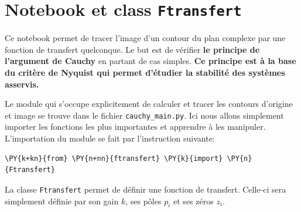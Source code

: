 \section{Notebook et class \texttt{Ftransfert}\label{principe-de-largument-de-cauchy}}
Ce notebook permet de tracer l'image d'un contour du plan complexe par
une fonction de transfert quelconque. Le but est de vérifier \textbf{le
principe de l'argument de Cauchy} en partant de cas simples. \textbf{Ce
principe est à la base du critère de Nyquist qui permet d'étudier la
stabilité des systèmes asservis.}
\begin{center}

\end{center}
Le module qui s'occupe explicitement de calculer et tracer les contours
d'origine et image se trouve dans le fichier \texttt{cauchy\_main.py}.
Ici nous allons simplement importer les fonctions les plus importantes
et apprendre à les manipuler.
L'importation du module se fait par l'instruction suivante:
\begin{tcolorbox}[breakable, size=fbox, boxrule=1pt, pad at break*=1mm,colback=cellbackground, colframe=cellborder]
\begin{Verbatim}[commandchars=\\\{\}]
\PY{k+kn}{from} \PY{n+nn}{ftransfert} \PY{k}{import} \PY{n}{Ftransfert}
\end{Verbatim}
\end{tcolorbox}

    La classe \texttt{Ftransfert} permet de définir une fonction de
transfert. Celle-ci sera simplement définie par son gain \(k\), ses
pôles \(p_i\) et ses zéros \(z_i\).

